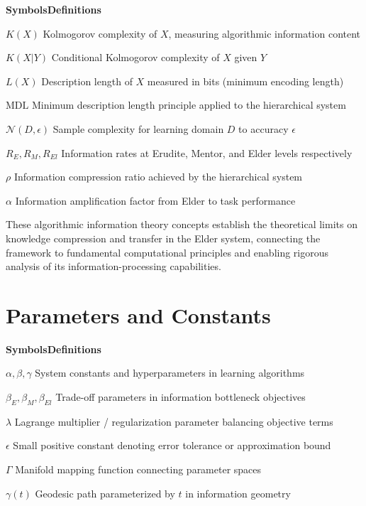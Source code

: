 \begin{multicols}{2}
\noindent\textbf{\large Symbols}\hfill\textbf{\large Definitions}

\vspace{0.3cm}
\noindent$K(X)$ \dotfill Kolmogorov complexity of $X$, measuring algorithmic information content

\noindent$K(X|Y)$ \dotfill Conditional Kolmogorov complexity of $X$ given $Y$

\noindent$L(X)$ \dotfill Description length of $X$ measured in bits (minimum encoding length)

\noindent$\text{MDL}$ \dotfill Minimum description length principle applied to the hierarchical system

\noindent$\mathcal{N}(D, \epsilon)$ \dotfill Sample complexity for learning domain $D$ to accuracy $\epsilon$

\noindent$R_E, R_M, R_{El}$ \dotfill Information rates at Erudite, Mentor, and Elder levels respectively

\noindent$\rho$ \dotfill Information compression ratio achieved by the hierarchical system

\noindent$\alpha$ \dotfill Information amplification factor from Elder to task performance
\end{multicols}

\vspace{1cm}
\begin{center}
These algorithmic information theory concepts establish the theoretical limits on knowledge compression and transfer in the Elder system, connecting the framework to fundamental computational principles and enabling rigorous analysis of its information-processing capabilities.
\end{center}

\clearpage
\chapter*{Parameters and Constants}

\begin{multicols}{2}
\noindent\textbf{\large Symbols}\hfill\textbf{\large Definitions}

\vspace{0.3cm}
\noindent$\alpha, \beta, \gamma$ \dotfill System constants and hyperparameters in learning algorithms

\noindent$\beta_E, \beta_M, \beta_{El}$ \dotfill Trade-off parameters in information bottleneck objectives

\noindent$\lambda$ \dotfill Lagrange multiplier / regularization parameter balancing objective terms

\noindent$\epsilon$ \dotfill Small positive constant denoting error tolerance or approximation bound

\noindent$\Gamma$ \dotfill Manifold mapping function connecting parameter spaces

\noindent$\gamma(t)$ \dotfill Geodesic path parameterized by $t$ in information geometry
\end{multicols}

